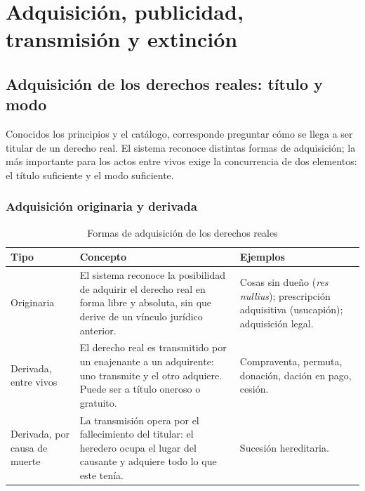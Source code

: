 \documentclass[12pt,oneside]{book}
\begin{document}


\part{Adquisición, publicidad, transmisión y extinción}

\chapter[Adquisición de los derechos reales: título y modo]{Adquisición de los derechos reales: título y modo}\label{cap:adquisicion}

Conocidos los principios y el catálogo, corresponde preguntar cómo se llega a ser titular de un derecho real. El sistema reconoce distintas formas de adquisición; la más importante para los actos entre vivos exige la concurrencia de dos elementos: el título suficiente y el modo suficiente.

\section{Adquisición originaria y derivada}

\begin{table}[H]
\centering
\small
\begin{tabularx}{\textwidth}{>{\raggedright\arraybackslash}p{}>{\raggedright\arraybackslash}X>{\raggedright\arraybackslash}p{}}
\toprule
\textbf{Tipo} & \textbf{Concepto} & \textbf{Ejemplos} \\
\midrule
Originaria & El sistema reconoce la posibilidad de adquirir el derecho real en forma libre y absoluta, sin que derive de un vínculo jurídico anterior. & Cosas sin dueño (\textit{res nullius}); prescripción adquisitiva (usucapión); adquisición legal. \\
Derivada, entre vivos & El derecho real es transmitido por un enajenante a un adquirente: uno transmite y el otro adquiere. Puede ser a título oneroso o gratuito. & Compraventa, permuta, donación, dación en pago, cesión. \\
Derivada, por causa de muerte & La transmisión opera por el fallecimiento del titular: el heredero ocupa el lugar del causante y adquiere todo lo que este tenía. & Sucesión hereditaria. \\
\bottomrule
\end{tabularx}
\caption{Formas de adquisición de los derechos reales}
\end{table}
\end{document}
